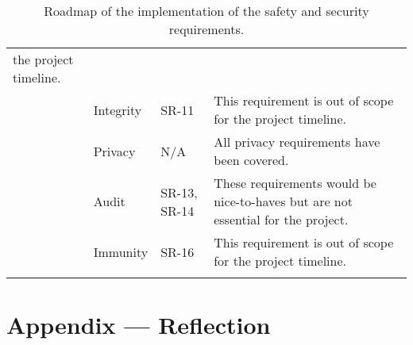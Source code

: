 \documentclass{article}
\begin{document}
\begin{longtable}[c]{|m{2cm}|m{2.6cm}|m{2.6cm}|m{5.8cm}|}
    the project timeline.\\
    \cline{2-4}
    & Integrity & SR-11 & This requirement is out of scope for the project
    timeline.\\
    \cline{2-4}
    & Privacy & N/A & All privacy requirements have been covered.\\
    \cline{2-4}
    & Audit & SR-13, SR-14 & These requirements would be nice-to-haves but are
    not essential for the project.\\
    \cline{2-4}
    & Immunity & SR-16 & This requirement is out of scope for the project
    timeline.\\
    \hline
    \caption{Roadmap of the implementation of the safety and security requirements.}
\end{longtable}

\newpage{}

\section*{Appendix --- Reflection}
\end{document}
